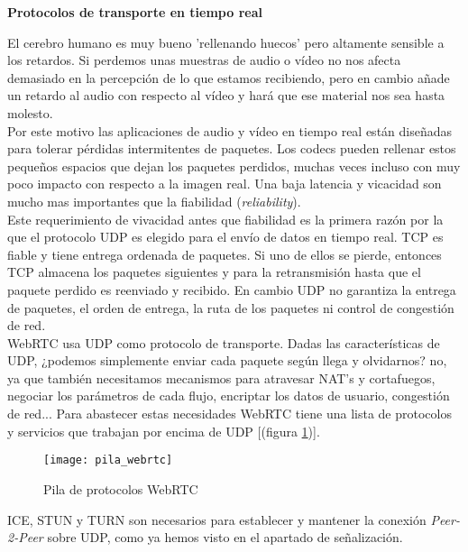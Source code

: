 \begin{normalsize}
\noindent \textbf{Protocolos de transporte en tiempo real}\\
\end{normalsize}

El cerebro humano es muy bueno 'rellenando huecos' pero altamente sensible a los retardos. Si perdemos unas muestras de audio o vídeo no nos afecta demasiado en la percepción de lo que estamos recibiendo, pero en cambio añade un retardo al audio con respecto al vídeo y hará que ese material nos sea hasta molesto.\\

Por este motivo las aplicaciones de audio y vídeo en tiempo real están diseñadas para tolerar pérdidas intermitentes de paquetes. Los codecs pueden rellenar estos pequeños espacios que dejan los paquetes perdidos, muchas veces incluso con muy poco impacto con respecto a la imagen real. Una baja latencia y vicacidad son mucho mas importantes que la fiabilidad (\emph{reliability}).\\

Este requerimiento de vivacidad antes que fiabilidad es la primera razón por la que el protocolo UDP es elegido para el envío de datos en tiempo real. TCP es fiable y tiene entrega ordenada de paquetes. Si uno de ellos se pierde, entonces TCP almacena los paquetes siguientes y para la retransmisión hasta que el paquete perdido es reenviado y recibido. En cambio UDP no garantiza la entrega de paquetes, el orden de entrega, la ruta de los paquetes ni control de congestión de red.\\

WebRTC usa UDP como protocolo de transporte. Dadas las características de UDP, ¿podemos simplemente enviar cada paquete según llega y olvidarnos? no, ya que también necesitamos mecanismos para atravesar NAT's y cortafuegos, negociar los parámetros de cada flujo, encriptar los datos de usuario, congestión de red... Para abastecer estas necesidades WebRTC tiene una lista de protocolos y servicios que trabajan por encima de UDP [(figura \ref{fig:pila_webrtc})].\\

\begin{figure}[h!]
\centering
\texttt{[image: pila\_webrtc]}
\caption{Pila de protocolos WebRTC}
\label{fig:pila_webrtc}
\end{figure}


ICE, STUN y TURN son necesarios para establecer y mantener la conexión \emph{Peer-2-Peer} sobre UDP, como ya hemos visto en el apartado de señalización.\\

